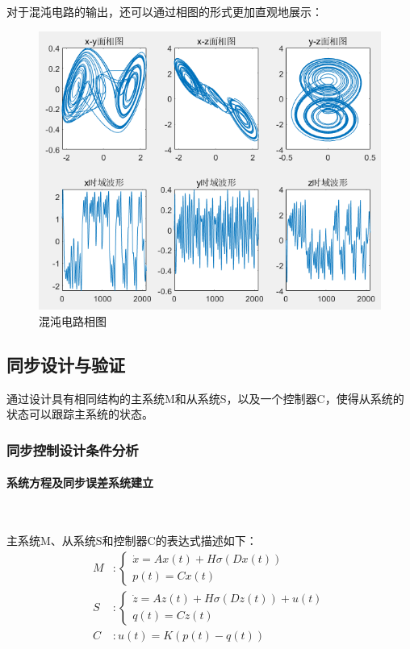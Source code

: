 \documentclass[UTF8]{article}
\begin{document}
对于混沌电路的输出，还可以通过相图的形式更加直观地展示：
\begin{figure}[H]
    \centering %
    \includegraphics[width=.6\textwidth]{figure/混沌电路-输出.png}
    \caption{混沌电路相图} %
\end{figure}

\subsection{同步设计与验证}

通过设计具有相同结构的主系统M和从系统S，以及一个控制器C，使得从系统的状态可以跟踪主系统的状态。

\subsubsection{同步控制设计条件分析}
\paragraph{系统方程及同步误差系统建立}~{}

主系统M、从系统S和控制器C的表达式描述如下：
\begin{align*}
	M&:\begin{cases}
		\dot{x} = Ax(t) + H\sigma(Dx(t)) \\
		p(t) = Cx(t)
	\end{cases} \\
	S&:\begin{cases}
		\dot{z} = Az(t) + H\sigma(Dz(t)) + u(t) \\
		q(t) = Cz(t)
	\end{cases} \\
	C&: u(t) = K(p(t) - q(t))
\end{align*}
\end{document}
